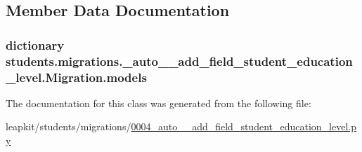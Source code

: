 \subsection{Member Data Documentation}
\hypertarget{classstudents_1_1migrations_1_10004__auto____add__field__student__education__level_1_1_migration_a52c034bfca3afbfe91f1d98ee4690657}{
\subsubsection[{models}]{\setlength{\rightskip}{0pt plus 5cm}dictionary students.\-migrations.\-\_\-auto\-\_\-\-\_\-add\-\_\-field\-\_\-student\-\_\-education\-\_\-level.\-Migration.\-models\hspace{0.3cm}{\ttfamily [static]}}}\label{classstudents_1_1migrations_1_10004__auto____add__field__student__education__level_1_1_migration_a52c034bfca3afbfe91f1d98ee4690657}


The documentation for this class was generated from the following file\-:\begin{DoxyCompactItemize}
\item 
leapkit/students/migrations/\hyperlink{0004__auto____add__field__student__education__level_8py}{0004\-\_\-auto\-\_\-\-\_\-add\-\_\-field\-\_\-student\-\_\-education\-\_\-level.\-py}\end{DoxyCompactItemize}
